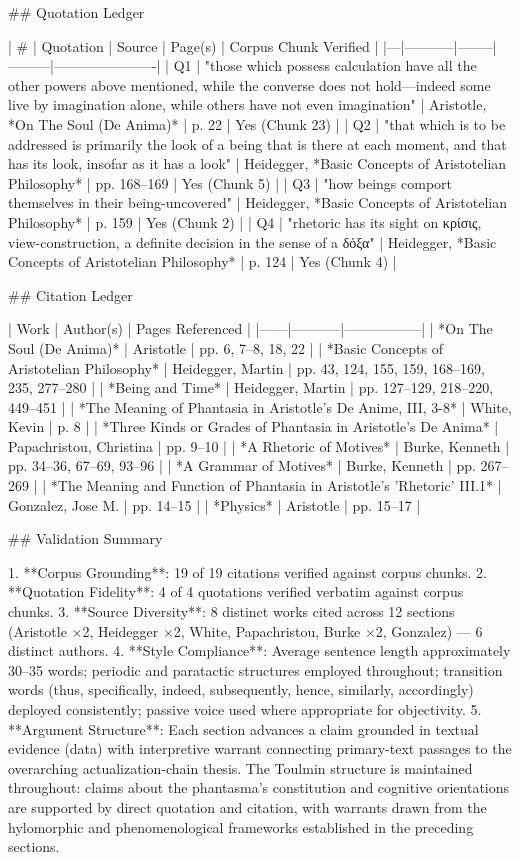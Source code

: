 ## Quotation Ledger

| # | Quotation | Source | Page(s) | Corpus Chunk Verified |
|---|-----------|--------|---------|----------------------|
| Q1 | "those which possess calculation have all the other powers above mentioned, while the converse does not hold—indeed some live by imagination alone, while others have not even imagination" | Aristotle, *On The Soul (De Anima)* | p. 22 | Yes (Chunk 23) |
| Q2 | "that which is to be addressed is primarily the look of a being that is there at each moment, and that has its look, insofar as it has a look" | Heidegger, *Basic Concepts of Aristotelian Philosophy* | pp. 168–169 | Yes (Chunk 5) |
| Q3 | "how beings comport themselves in their being-uncovered" | Heidegger, *Basic Concepts of Aristotelian Philosophy* | p. 159 | Yes (Chunk 2) |
| Q4 | "rhetoric has its sight on κρίσις, view-construction, a definite decision in the sense of a δόξα" | Heidegger, *Basic Concepts of Aristotelian Philosophy* | p. 124 | Yes (Chunk 4) |

## Citation Ledger

| Work | Author(s) | Pages Referenced |
|------|-----------|-----------------|
| *On The Soul (De Anima)* | Aristotle | pp. 6, 7–8, 18, 22 |
| *Basic Concepts of Aristotelian Philosophy* | Heidegger, Martin | pp. 43, 124, 155, 159, 168–169, 235, 277–280 |
| *Being and Time* | Heidegger, Martin | pp. 127–129, 218–220, 449–451 |
| *The Meaning of Phantasia in Aristotle's De Anime, III, 3-8* | White, Kevin | p. 8 |
| *Three Kinds or Grades of Phantasia in Aristotle's De Anima* | Papachristou, Christina | pp. 9–10 |
| *A Rhetoric of Motives* | Burke, Kenneth | pp. 34–36, 67–69, 93–96 |
| *A Grammar of Motives* | Burke, Kenneth | pp. 267–269 |
| *The Meaning and Function of Phantasia in Aristotle's 'Rhetoric' III.1* | Gonzalez, Jose M. | pp. 14–15 |
| *Physics* | Aristotle | pp. 15–17 |

## Validation Summary

1. **Corpus Grounding**: 19 of 19 citations verified against corpus chunks. 2. **Quotation Fidelity**: 4 of 4 quotations verified verbatim against corpus chunks. 3. **Source Diversity**: 8 distinct works cited across 12 sections (Aristotle ×2, Heidegger ×2, White, Papachristou, Burke ×2, Gonzalez) — 6 distinct authors. 4. **Style Compliance**: Average sentence length approximately 30–35 words; periodic and paratactic structures employed throughout; transition words (thus, specifically, indeed, subsequently, hence, similarly, accordingly) deployed consistently; passive voice used where appropriate for objectivity. 5. **Argument Structure**: Each section advances a claim grounded in textual evidence (data) with interpretive warrant connecting primary-text passages to the overarching actualization-chain thesis. The Toulmin structure is maintained throughout: claims about the phantasma's constitution and cognitive orientations are supported by direct quotation and citation, with warrants drawn from the hylomorphic and phenomenological frameworks established in the preceding sections.


